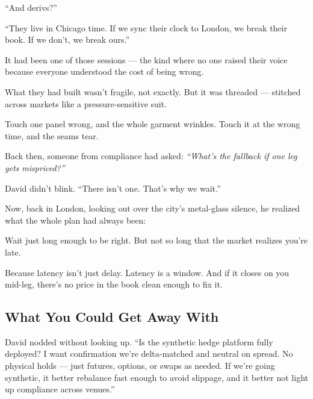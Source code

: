 “And derivs?”

“They live in Chicago time. If we sync their clock to London, we break their book. If we don’t, 
we break ours.”

It had been one of those sessions — the kind where no one raised their voice because everyone 
understood the cost of being wrong.

What they had built wasn’t fragile, not exactly.
But it was threaded — stitched across markets like a pressure-sensitive suit.

Touch one panel wrong, and the whole garment wrinkles.
Touch it at the wrong time, and the seams tear.

Back then, someone from compliance had asked:
\textit{“What’s the fallback if one leg gets mispriced?”}

David didn’t blink.
“There isn’t one. That’s why we wait.”

Now, back in London, looking out over the city’s metal-glass silence,
he realized what the whole plan had always been:

Wait just long enough to be right.
But not so long that the market realizes you’re late.

Because latency isn’t just delay.
Latency is a window.
And if it closes on you mid-leg,
there’s no price in the book clean enough to fix it.





\subsection{What You Could Get Away With}


David nodded without looking up.
``Is the synthetic hedge platform fully deployed? I want confirmation we’re delta-matched and 
neutral on spread. No physical holds — just futures, options, or swaps as needed. If we’re going 
synthetic, it better rebalance fast enough to avoid slippage, and it better not light up 
compliance across venues.''

\medskip

